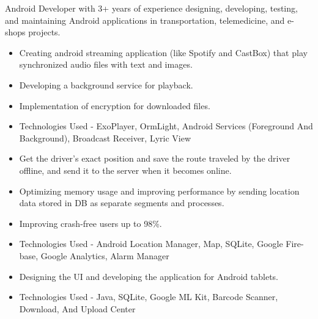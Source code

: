 \documentclass[10pt,a4paper,ragged2e,withhyper]{altacv}
\begin{document}
\begin{paracol}{2}


 {\normalsize\color{emphasis} Android Developer with 3+ years of experience designing, developing, testing, and maintaining Android applications in transportation, telemedicine, and e-shops projects.
 \par}
 \medskip
 

\divider

\begin{itemize}
\item Creating android streaming application (like Spotify and CastBox) that play synchronized audio files with text and images.
\item Developing a background service for playback.
\item Implementation of encryption for downloaded files.
\item Technologies Used - ExoPlayer, OrmLight, Android Services (Foreground
And Background), Broadcast Receiver, Lyric View
\end{itemize}

\divider

\begin{itemize}
\item Get the driver's exact position and save the route traveled by the driver offline, and send it to the server when it becomes online.
\item Optimizing memory usage and improving performance by sending location data stored in DB as separate segments and processes.
\item Improving crash-free users up to 98\%.
\item Technologies Used - Android Location Manager, Map, SQLite, Google Fire-
base, Google Analytics, Alarm Manager
\end{itemize}

\divider

\begin{itemize}
\item Designing the UI and developing the application for Android tablets.
\item Technologies Used - Java, SQLite, Google ML Kit, Barcode Scanner, Download, And Upload Center
\end{itemize}



\end{paracol}
\end{document}
